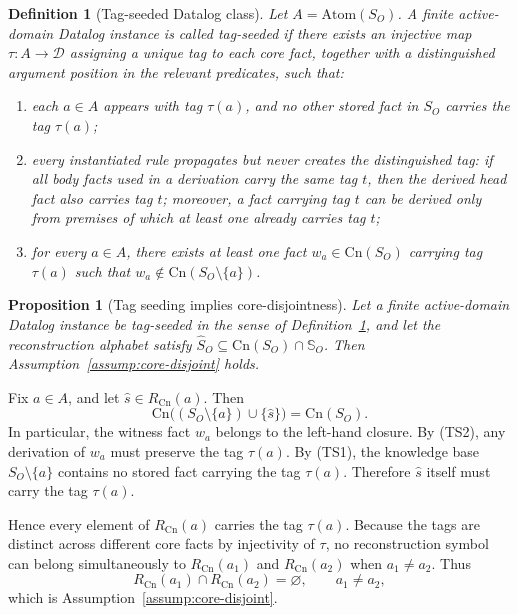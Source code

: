 \documentclass[journal,onecolumn]{IEEEtran}
\makeatletter
\newcommand{\Atom}{\text{Atom}}
\newcommand{\Cn}{\text{Cn}}
\newtheorem{proposition}{Proposition}[section]
\newtheorem{definition}{Definition}[section]
\numberwithin{equation}{section}
\renewenvironment{proof}[1][\proofname]{\par
  \pushQED{\qed}%
  \normalfont \topsep6\p@\@plus6\p@\relax
  \trivlist
  \item[\hskip\labelsep
        \itshape
    #1\@addpunct{.}]\ignorespaces
}{%
  \popQED\endtrivlist\@endpefalse
}
\makeatother
\begin{document}
\begin{definition}[Tag-seeded Datalog class]
\label{def:tag-propagating-datalog}
Let \(A=\Atom(S_O)\).
A finite active-domain Datalog instance is called
\emph{tag-seeded} if there exists an injective map
\(\tau:A\to\mathcal D\) assigning a unique tag to each core fact,
together with a distinguished argument position in the relevant
predicates, such that:
\begin{enumerate}[label=\textup{(TS\arabic*)}]
  \item each \(a\in A\) appears with tag \(\tau(a)\), and no other
        stored fact in \(S_O\) carries the tag \(\tau(a)\);
  \item every instantiated rule propagates but never creates the
        distinguished tag: if all body facts used in a derivation
        carry the same tag \(t\), then the derived head fact also
        carries tag \(t\); moreover, a fact carrying tag \(t\) can be
        derived only from premises of which at least one already
        carries tag \(t\);
  \item for every \(a\in A\), there exists at least one fact
        \(w_a\in\Cn(S_O)\) carrying tag \(\tau(a)\) such that
        \(w_a\notin\Cn(S_O\setminus\{a\})\).
\end{enumerate}
\end{definition}

\begin{proposition}[Tag seeding implies core-disjointness]
\label{prop:datalog-core-disjoint}
Let a finite active-domain Datalog instance be tag-seeded in the
sense of Definition~\ref{def:tag-propagating-datalog}, and let the
reconstruction alphabet satisfy
\(\hat S_O\subseteq\Cn(S_O)\cap\mathbb{S}_O\).
Then Assumption~\textup{\ref{assump:core-disjoint}} holds.
\end{proposition}

\begin{proof}
Fix \(a\in A\), and let \(\hat s\in R_{\Cn}(a)\).
Then
\[
  \Cn\bigl((S_O\setminus\{a\})\cup\{\hat s\}\bigr)=\Cn(S_O).
\]
In particular, the witness fact \(w_a\) belongs to the left-hand
closure.
By \textup{(TS2)}, any derivation of \(w_a\) must preserve the tag
\(\tau(a)\).
By \textup{(TS1)}, the knowledge base \(S_O\setminus\{a\}\) contains
no stored fact carrying the tag \(\tau(a)\).
Therefore \(\hat s\) itself must carry the tag \(\tau(a)\).

Hence every element of \(R_{\Cn}(a)\) carries the tag \(\tau(a)\).
Because the tags are distinct across different core facts by
injectivity of \(\tau\), no reconstruction symbol can belong
simultaneously to \(R_{\Cn}(a_1)\) and \(R_{\Cn}(a_2)\) when
\(a_1\neq a_2\).
Thus
\[
  R_{\Cn}(a_1)\cap R_{\Cn}(a_2)=\varnothing,
  \qquad a_1\neq a_2,
\]
which is Assumption~\ref{assump:core-disjoint}.
\end{proof}
\end{document}

